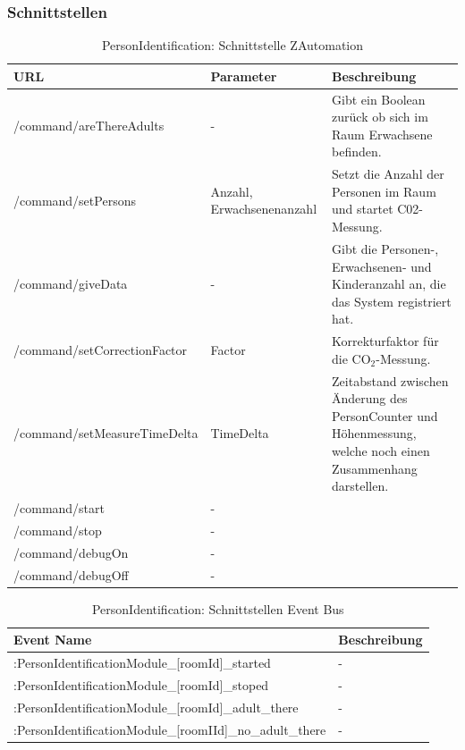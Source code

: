 \subsubsection{Schnittstellen}
\begin{table}[H]
	\begin{tabularx}{\textwidth}{
			>{\hsize=1.25\hsize}X %
			>{\hsize=0.5\hsize\centering}X %
			>{\hsize=1.25\hsize}X %
		}
		\hline
		\textbf{URL}						& \textbf{Parameter}	& \textbf{Beschreibung} \\
		\hline 
		/command/areThereAdults				
		& - 	
		& Gibt ein Boolean zurück ob sich im Raum Erwachsene befinden. \\ 
		\hline 
		/command/setPersons		
		& Anzahl, Erwachsenenanzahl		%
		& Setzt die Anzahl der Personen im Raum und startet C02-Messung. \\
		\hline 
		/command/giveData
		& - 				
		& Gibt die Personen-, Erwachsenen- und Kinderanzahl an, die das System registriert hat. \\
		\hline
		/command/setCorrectionFactor
		& Factor
		& Korrekturfaktor für die CO$_2$-Messung. \\
		\hline
		/command/setMeasureTimeDelta
		& TimeDelta
		& Zeitabstand zwischen Änderung des PersonCounter und Höhenmessung, welche noch einen Zusammenhang darstellen. \\
		\hline
		/command/start
		& -
		& \\
		\hline
		/command/stop
		& - 
		& \\
		\hline
		/command/debugOn
		& - 
		& \\
		\hline
		/command/debugOff
		& - 
		& \\
		\hline
	\end{tabularx}
	\caption{PersonIdentification: Schnittstelle ZAutomation}
\end{table}

\begin{table}[H]
	\begin{tabularx}{\textwidth}{
			>{\hsize=1.2\hsize}X 
			>{\hsize=0.8\hsize}X
		}
		\hline
		\textbf{Event Name}						& \textbf{Beschreibung} \\ %
		\hline
		[deviceId]:PersonIdentificationModule\_[roomId]\_started	
		& - \\
		\hline 
		[deviceId]:PersonIdentificationModule\_[roomId]\_stoped
		& - \\
		\hline
		[deviceId]:PersonIdentificationModule\_[roomId]\_adult\_there
		& - \\
		\hline
		[deviceId]:PersonIdentificationModule\_[roomIId]\_no\_adult\_there
		& - \\
		\hline
	\end{tabularx}
	\caption{PersonIdentification: Schnittstellen Event Bus}
\end{table}

